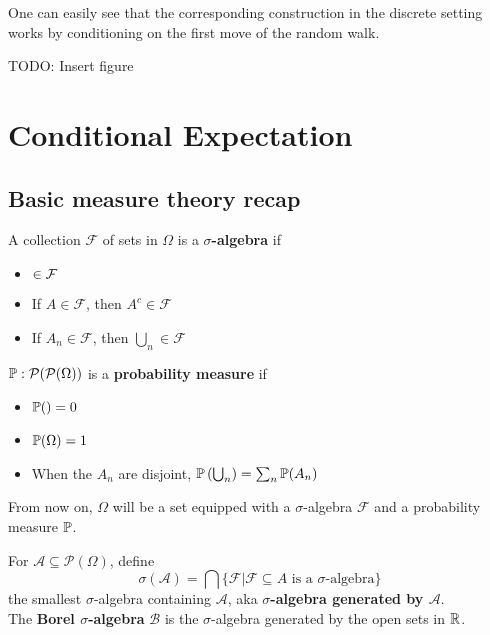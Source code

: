 \documentclass{article}
\begin{document}
One can easily see that the corresponding construction in the discrete setting works by conditioning on the first move of the random walk.

TODO: Insert figure

\clearpage

\section{Conditional Expectation}

\subsection{Basic measure theory recap}

\begin{defi}
  A collection $\mathcal F$ of sets in $\Omega$ is a {\bf $\sigma$-algebra} if
  \begin{itemize}
    \item $\empty \in \mathcal F$
    \item If $A \in \mathcal F$, then $A^c \in \mathcal F$
    \item If $A_n \in \mathcal F$, then $\bigcup_n \in \mathcal F$
  \end{itemize}
\end{defi}

\begin{defi}
  $\P : \mathcal P(\mathcal P(\Omega))$ is a {\bf probability measure} if
  \begin{itemize}
    \item $\P(\empty) = 0$
    \item $\P(\Omega) = 1$
    \item When the $A_n$ are disjoint, $\P\left(\bigcup_n\right) = \sum_n \P(A_n)$
  \end{itemize}
\end{defi}

From now on, $\Omega$ will be a set equipped with a $\sigma$-algebra $\mathcal F$ and a probability measure $\P$.

\begin{defi}
  For $\mathcal A \subseteq \mathcal P(\Omega)$, define
  $$\sigma(\mathcal A) = \bigcap \{\mathcal F | \mathcal F \subseteq A \text{ is a $\sigma$-algebra}\}$$
  the smallest $\sigma$-algebra containing $\mathcal A$, aka {\bf $\sigma$-algebra generated by $\mathcal A$}. \\
  The {\bf Borel $\sigma$-algebra} $\mathcal B$ is the $\sigma$-algebra generated by the open sets in $\R$.
\end{defi}
\end{document}
